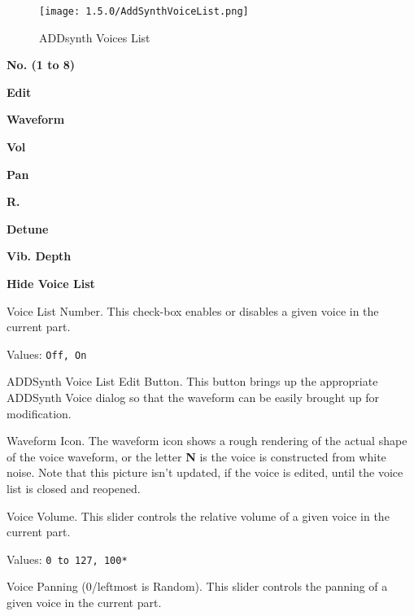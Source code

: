 \begin{figure}[H]
   \centering 
   \texttt{[image: 1.5.0/AddSynthVoiceList.png]}
   \caption{ADDsynth Voices List}
   \label{fig:addsynth_voices_list}
\end{figure}

   \begin{enumber}
      \item \textbf{No. (1 to 8)}
      \item \textbf{Edit}
      \item \textbf{Waveform}
      \item \textbf{Vol}
      \item \textbf{Pan}
      \item \textbf{R.}
      \item \textbf{Detune}
      \item \textbf{Vib. Depth}
      \item \textbf{Hide Voice List}
   \end{enumber}

   \setcounter{ItemCounter}{0}      %

   Voice List Number.
   This check-box enables or disables a given voice in the current part.

   Values: \texttt{Off, On}

   ADDSynth Voice List Edit Button.
   This button brings up the appropriate ADDSynth Voice dialog so that the
   waveform can be easily brought up for modification.

   Waveform Icon.
   The waveform icon shows a rough rendering of the actual shape of the
   voice waveform, or the letter \textbf{N} is the voice is constructed from
   white noise.  Note that this picture isn't updated, if the voice is
   edited, until the voice list is closed and reopened.

   Voice Volume.
   This slider controls the relative volume of a given voice in the current
   part.

   Values: \texttt{0 to 127, 100*}

   Voice Panning (0/leftmost is Random).
   This slider controls the panning of a given voice in the current part.

